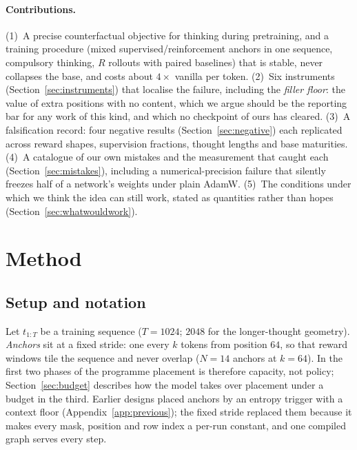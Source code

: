 \documentclass{article} %
\begin{document}
\paragraph{Contributions.}
(1)~A precise counterfactual objective for thinking during pretraining, and a training procedure (mixed supervised/reinforcement anchors in one sequence, compulsory thinking, $R$ rollouts with paired baselines) that is stable, never collapses the base, and costs about $4\times$ vanilla per token.
(2)~Six instruments (Section~\ref{sec:instruments}) that localise the failure, including the \emph{filler floor}: the value of extra positions with no content, which we argue should be the reporting bar for any work of this kind, and which no checkpoint of ours has cleared.
(3)~A falsification record: four negative results (Section~\ref{sec:negative}) each replicated across reward shapes, supervision fractions, thought lengths and base maturities.
(4)~A catalogue of our own mistakes and the measurement that caught each (Section~\ref{sec:mistakes}), including a numerical-precision failure that silently freezes half of a network's weights under plain AdamW.
(5)~The conditions under which we think the idea can still work, stated as quantities rather than hopes (Section~\ref{sec:whatwouldwork}).

\section{Method}
\label{sec:method}

\subsection{Setup and notation}

Let $t_{1:T}$ be a training sequence ($T=1024$; $2048$ for the longer-thought geometry). \emph{Anchors} sit at a fixed stride: one every $k$ tokens from position $64$, so that reward windows tile the sequence and never overlap ($N=14$ anchors at $k=64$). In the first two phases of the programme placement is therefore capacity, not policy; Section~\ref{sec:budget} describes how the model takes over placement under a budget in the third. Earlier designs placed anchors by an entropy trigger with a context floor (Appendix~\ref{app:previous}); the fixed stride replaced them because it makes every mask, position and row index a per-run constant, and one compiled graph serves every step.
\end{document}
